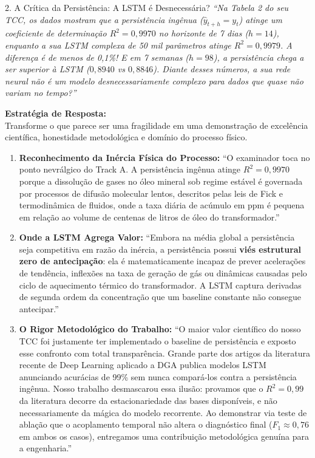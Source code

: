 \documentclass[11pt,a4paper]{article}
\begin{document}
\begin{boardQuestion}{2. A Crítica da Persistência: A LSTM é Desnecessária?}
\textit{“Na Tabela 2 do seu TCC, os dados mostram que a persistência ingênua ($\hat{y}_{t+h} = y_t$) atinge um coeficiente de determinação $R^2 = 0{,}9970$ no horizonte de 7 dias ($h=14$), enquanto a sua LSTM complexa de 50 mil parâmetros atinge $R^2 = 0{,}9979$. A diferença é de menos de 0,1\%! E em 7 semanas ($h=98$), a persistência chega a ser superior à LSTM ($0{,}8940$ vs $0{,}8846$). Diante desses números, a sua rede neural não é um modelo desnecessariamente complexo para dados que quase não variam no tempo?”}
\end{boardQuestion}

\begin{boardAnswer}
\textbf{Estratégia de Resposta:}\\
Transforme o que parece ser uma fragilidade em uma demonstração de excelência científica, honestidade metodológica e domínio do processo físico.

\begin{enumerate}[leftmargin=0.8cm]
  \item \textbf{Reconhecimento da Inércia Física do Processo:} ``O examinador toca no ponto nevrálgico do Track A. A persistência ingênua atinge $R^2 = 0{,}9970$ porque a dissolução de gases no óleo mineral sob regime estável é governada por processos de difusão molecular lentos, descritos pelas leis de Fick e termodinâmica de fluidos, onde a taxa diária de acúmulo em ppm é pequena em relação ao volume de centenas de litros de óleo do transformador.''
  \item \textbf{Onde a LSTM Agrega Valor:} ``Embora na média global a persistência seja competitiva em razão da inércia, a persistência possui \textbf{viés estrutural zero de antecipação}: ela é matematicamente incapaz de prever acelerações de tendência, inflexões na taxa de geração de gás ou dinâmicas causadas pelo ciclo de aquecimento térmico do transformador. A LSTM captura derivadas de segunda ordem da concentração que um baseline constante não consegue antecipar.''
  \item \textbf{O Rigor Metodológico do Trabalho:} ``O maior valor científico do nosso TCC foi justamente ter implementado o baseline de persistência e exposto esse confronto com total transparência. Grande parte dos artigos da literatura recente de Deep Learning aplicado a DGA publica modelos LSTM anunciando acurácias de 99\% sem nunca compará-los contra a persistência ingênua. Nosso trabalho desmascarou essa ilusão: provamos que o $R^2 = 0{,}99$ da literatura decorre da estacionariedade das bases disponíveis, e não necessariamente da mágica do modelo recorrente. Ao demonstrar via teste de ablação que o acoplamento temporal não altera o diagnóstico final ($F_1 \approx 0{,}76$ em ambos os casos), entregamos uma contribuição metodológica genuína para a engenharia.''
\end{enumerate}
\end{boardAnswer}
\end{document}
